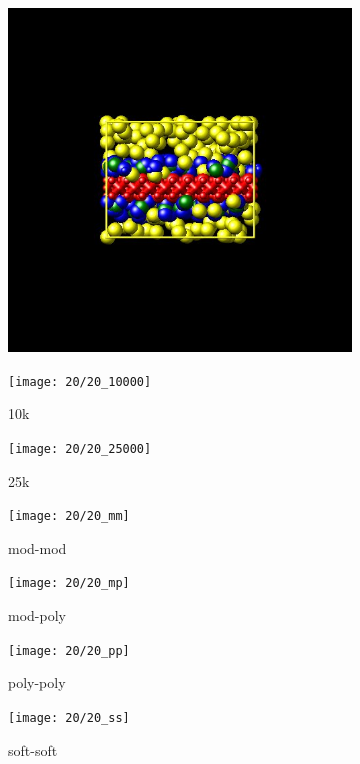 \documentclass[a4paper]{article}
\begin{document}
\begin{figure}[H]
\begin{subfigure}{0.3\textwidth}
  \centering
  \includegraphics[width=\linewidth,keepaspectratio]{start}
  \caption{}
\end{subfigure}
\begin{subfigure}{0.3\textwidth}
  \centering
  \texttt{[image: 20/20\_10000]}
  \caption{10k}
\end{subfigure}
\begin{subfigure}{0.3\textwidth}
  \centering
  \texttt{[image: 20/20\_25000]}
  \caption{25k}
\end{subfigure}
\caption{}
\label{fig_1}
\end{figure}

\begin{figure}[H]
\begin{subfigure}{0.24\textwidth}
  \centering
  \texttt{[image: 20/20\_mm]}
  \caption{mod-mod}
\end{subfigure}
\begin{subfigure}{0.24\textwidth}
  \centering
  \texttt{[image: 20/20\_mp]}
  \caption{mod-poly}
\end{subfigure}
\begin{subfigure}{0.24\textwidth}
  \centering
  \texttt{[image: 20/20\_pp]}
  \caption{poly-poly}
\end{subfigure}
\begin{subfigure}{0.24\textwidth}
  \centering
  \texttt{[image: 20/20\_ss]}
  \caption{soft-soft}
\end{subfigure}
\caption{}
\label{fig_1}
\end{figure}
\end{document}
